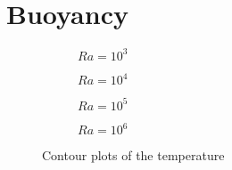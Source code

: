 \chapter{Buoyancy}
\begin{figure}[H]
\centering
\begin{subfigure}{0.5\textwidth}
	\resizebox{1.4\textwidth}{!}{}
	\caption{$Ra=10^{3}$}
\end{subfigure}%
\begin{subfigure}{0.5\textwidth}
	\resizebox{1.4\textwidth}{!}{}
	\caption{$Ra=10^{4}$}
\end{subfigure}
\begin{subfigure}{0.5\textwidth}
	\resizebox{1.4\textwidth}{!}{}
	\caption{$Ra=10^{5}$}
\end{subfigure}%
\begin{subfigure}{0.5\textwidth}
	\resizebox{1.4\textwidth}{!}{}
	\caption{$Ra=10^{6}$}
\end{subfigure}
\caption{Contour plots of the temperature}
\end{figure}